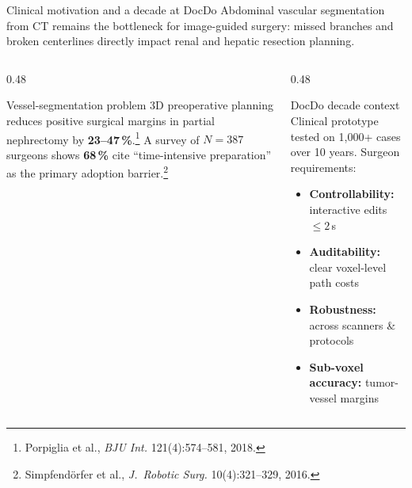 \documentclass[aspectratio=169,11pt,xcolor=table]{beamer}
\begin{document}
\begin{frame}{Clinical motivation and a decade at DocDo}
\scriptsize
Abdominal vascular segmentation from CT remains the bottleneck for image-guided surgery: missed branches and broken centerlines directly impact renal and hepatic resection planning.
\vspace{0.15cm}
\begin{columns}[T]
\begin{column}{0.48\linewidth}
\begin{block}{Vessel-segmentation problem}
\scriptsize
3D preoperative planning reduces positive surgical margins in partial nephrectomy by \alert{\textbf{23--47\,\%}}.\footnote{\scriptsize Porpiglia et al., \emph{BJU Int.} 121(4):574--581, 2018.} A survey of $N=387$ surgeons shows \alert{\textbf{68\,\%}} cite ``time-intensive preparation'' as the primary adoption barrier.\footnote{\scriptsize Simpfend\"orfer et al., \emph{J.~Robotic Surg.} 10(4):321--329, 2016.}
\end{block}
\end{column}
\begin{column}{0.48\linewidth}
\begin{block}{DocDo decade context}
\scriptsize
Clinical prototype tested on 1{,}000+ cases over 10 years. Surgeon requirements:
\begin{itemize}
\setlength\itemsep{1pt}
\item \textbf{Controllability:} interactive edits $\le 2$\,s
\item \textbf{Auditability:} clear voxel-level path costs
\item \textbf{Robustness:} across scanners \& protocols
\item \textbf{Sub-voxel accuracy:} tumor-vessel margins
\end{itemize}
\end{block}
\end{column}
\end{columns}
\end{frame}
\end{document}
